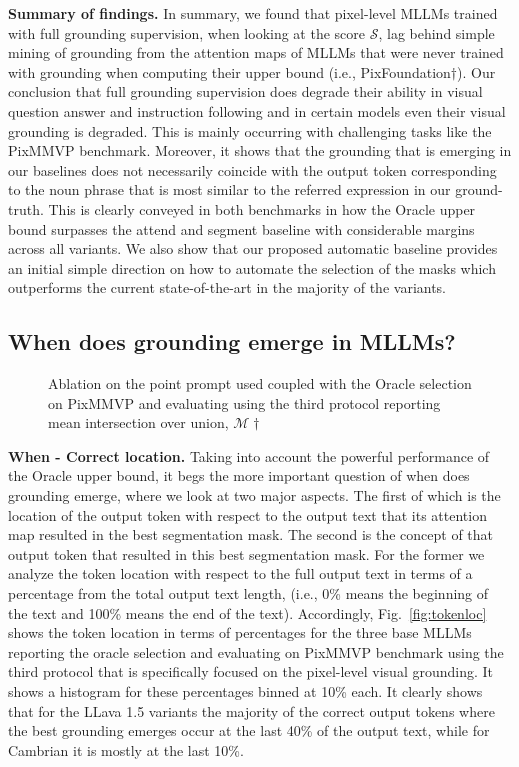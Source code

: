 \textbf{Summary of findings.} In summary, we found that pixel-level MLLMs trained with full grounding supervision, when looking at the score $\mathcal{S}$, lag behind simple mining of grounding from the attention maps of MLLMs that were never trained with grounding when computing their upper bound (i.e., PixFoundation$\dagger$). Our conclusion that full grounding supervision does degrade their ability in visual question answer and instruction following and in certain models even their visual grounding is degraded. This is mainly occurring with challenging tasks like the PixMMVP benchmark. Moreover, it shows that the grounding that is emerging in our baselines does not necessarily coincide with the output token corresponding to the noun phrase that is most similar to the referred expression in our ground-truth. This is clearly conveyed in both benchmarks in how the Oracle upper bound surpasses the attend and segment baseline with considerable margins across all variants. We also show that our proposed automatic baseline provides an initial simple direction on how to automate the selection of the masks which outperforms the current state-of-the-art in the majority of the variants.

\subsection{When does grounding emerge in MLLMs?}

\begin{figure}[t]
\centering

\label{fig:ablation}
\caption{Ablation on the point prompt used coupled with the Oracle selection on PixMMVP and evaluating using the third protocol reporting mean intersection over union, $\mathcal{M}\dagger$}
\label{tab:When_MMVP}
\end{figure}

\textbf{When - Correct location.} Taking into account the powerful performance of the Oracle upper bound, it begs the more important question of when does grounding emerge, where we look at two major aspects. The first of which is the location of the output token with respect to the output text that its attention map resulted in the best segmentation mask. The second is the concept of that output token that resulted in this best segmentation mask. For the former we analyze the token location with respect to the full output text in terms of a percentage from the total output text length, (i.e., 0\% means the beginning of the text and 100\% means the end of the text). Accordingly, Fig.~\ref{fig:tokenloc} shows the token location in terms of percentages for the three base MLLMs reporting the oracle selection and evaluating on PixMMVP benchmark using the third protocol that is specifically focused on the pixel-level visual grounding. It shows a histogram for these percentages binned at 10\% each. It clearly shows that for the LLava 1.5 variants the majority of the correct output tokens where the best grounding emerges occur at the last 40\% of the output text, while for Cambrian it is mostly at the last 10\%. 

